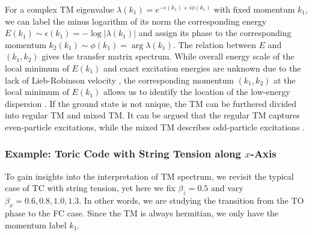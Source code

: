 \documentclass{ntuthesis}
\newcommand{\citep}{\cite}
\begin{document}
For a complex TM eigenvalue $\lambda(k_1) = e^{-\epsilon(k_1) +i\phi(k_1)}$ with fixed momentum $k_1$, we can label the minus logarithm of its norm the corresponding energy $E(k_1) \sim \epsilon(k_1) = -\log{|\lambda(k_1)|}$ and assign its phase to the corresponding momentum $k_2(k_1) \sim \phi(k_1) = \arg \lambda(k_1)$. The relation between $E$ and $(k_1, k_2)$ gives the transfer matrix spectrum.
%
While overall energy scale of the local minimum of $E(k_1)$ and exact excitation energies are unknown due to the lack of Lieb-Robinson velocity \citep{1972_Lieb}, the corresponding momentum $(k_1,k_2)$ at the local minimum of $E(k_1)$ allows us to identify the location of the low-energy dispersion \cite{2015_Zauner}. 
%
If the ground state is not unique, the TM can be furthered divided into regular TM and mixed TM. It can be argued that the regular TM captures even-particle excitations, while the mixed TM describes odd-particle excitations \citep{2015_Zauner}.

\subsubsection{Example: Toric Code with String Tension along $x$-Axis}
%
To gain insights into the interpretation of TM spectrum, we revisit the typical case of TC with string tension, yet here we fix $\beta_z = 0.5$ and vary $\beta_x = 0.6,0.8,1.0,1.3$. In other words, we are studying the transition from the TO phase to the FC case. Since the TM is always hermitian, we only have the momentum label $k_1$.
\end{document}
